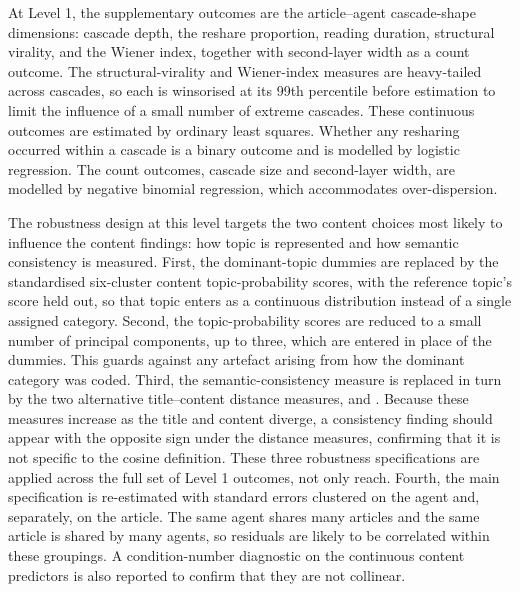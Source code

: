 At Level 1, the supplementary outcomes are the article–agent cascade-shape dimensions: cascade depth, the reshare proportion, reading duration, structural virality, and the Wiener index, together with second-layer width as a count outcome. The structural-virality and Wiener-index measures are heavy-tailed across cascades, so each is winsorised at its 99th percentile before estimation to limit the influence of a small number of extreme cascades. These continuous outcomes are estimated by ordinary least squares. Whether any resharing occurred within a cascade is a binary outcome and is modelled by logistic regression. The count outcomes, cascade size and second-layer width, are modelled by negative binomial regression, which accommodates over-dispersion.

The robustness design at this level targets the two content choices most likely to influence the content findings: how topic is represented and how semantic consistency is measured. First, the dominant-topic dummies are replaced by the standardised six-cluster content topic-probability scores, with the reference topic's score held out, so that topic enters as a continuous distribution instead of a single assigned category. Second, the topic-probability scores are reduced to a small number of principal components, up to three, which are entered in place of the dummies. This guards against any artefact arising from how the dominant category was coded. Third, the semantic-consistency measure  is replaced in turn by the two alternative title–content distance measures,  and . Because these measures increase as the title and content diverge, a consistency finding should appear with the opposite sign under the distance measures, confirming that it is not specific to the cosine definition. These three robustness specifications are applied across the full set of Level 1 outcomes, not only reach. Fourth, the main specification is re-estimated with standard errors clustered on the agent and, separately, on the article. The same agent shares many articles and the same article is shared by many agents, so residuals are likely to be correlated within these groupings. A condition-number diagnostic on the continuous content predictors is also reported to confirm that they are not collinear.

